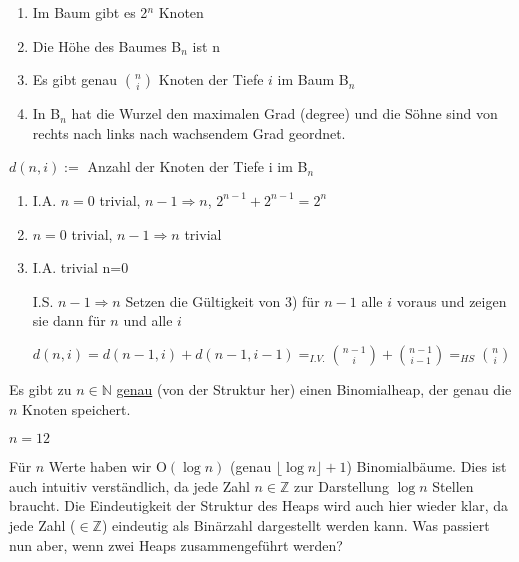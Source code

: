 \begin{satz}
\begin{enumerate}
\item Im Baum gibt es 2$^n$ Knoten
\item Die Höhe des Baumes B$_n$ ist n
\item Es gibt genau $\binom{n}{i}$ Knoten der Tiefe $i$ im Baum B$_n$
\item In B$_n$ hat die Wurzel den maximalen Grad (degree) und die Söhne sind von rechts nach links nach wachsendem Grad
geordnet.
\end{enumerate}
\end{satz}

\begin{definition}
$d(n,i):=$ Anzahl der Knoten der Tiefe i im B$_n$
\end{definition}

\begin{beweis}
\begin{enumerate}
\item I.A. $n=0$ trivial, $n-1 \Rightarrow n$, $2^{n-1}+2^{n-1}=2^n$ 
\item $n=0$ trivial, $n-1 \Rightarrow n$ trivial
\item 

I.A. trivial n=0

I.S. $n-1 \Rightarrow n$ Setzen die Gültigkeit von 3) für $n-1$ alle $i$ voraus und zeigen sie dann für $n$ und alle
$i$

$d(n,i)=d(n-1,i)+d(n-1,i-1)=_{I.V.} \binom{n-1}{i}+ \binom{n-1}{i-1}=_{HS} \binom{n}{i}$
\end{enumerate}
\end{beweis}

Es gibt zu $n \in \mathbb{N}$ \underline{genau} (von der Struktur her) einen Binomialheap, der genau die $n$ Knoten
speichert.
 
\begin{beweis}
$n=12$ 
\end{beweis} 

\begin{figure}[H]
  \centering
   
  
  \end{figure}
  
Für $n$ Werte haben wir O$(\log n)$ (genau $\lfloor \log n \rfloor +1$) Binomialbäume. Dies ist auch intuitiv
verständlich, da jede Zahl $n \in \mathbb{Z}$ zur Darstellung $\log n$ Stellen braucht. Die Eindeutigkeit der Struktur
des Heaps wird auch hier wieder klar, da jede Zahl ($\in \mathbb{Z}$) eindeutig als Binärzahl dargestellt werden kann.
Was passiert nun aber, wenn zwei Heaps zusammengeführt werden?


